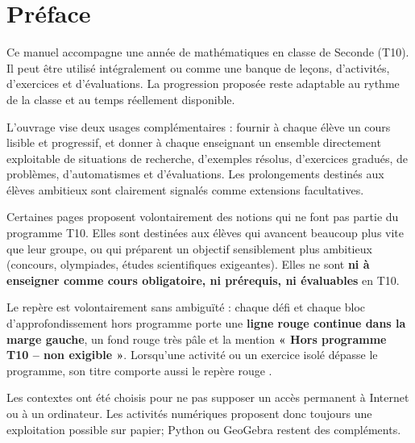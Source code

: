 \chapter*{Préface}

Ce manuel accompagne une année de mathématiques en classe de Seconde (T10).
Il peut être utilisé intégralement ou comme une banque de leçons, d'activités,
d'exercices et d'évaluations. La progression proposée reste adaptable au rythme
de la classe et au temps réellement disponible.

L'ouvrage vise deux usages complémentaires : fournir à chaque élève un cours
lisible et progressif, et donner à chaque enseignant un ensemble directement
exploitable de situations de recherche, d'exemples résolus, d'exercices gradués,
de problèmes, d'automatismes et d'évaluations. Les prolongements destinés aux
élèves ambitieux sont clairement signalés comme extensions facultatives.

\begin{extensiont10box}
Certaines pages proposent volontairement des notions qui ne font pas partie du
programme T10. Elles sont destinées aux élèves qui avancent beaucoup plus vite
que leur groupe, ou qui préparent un objectif sensiblement plus ambitieux
(concours, olympiades, études scientifiques exigeantes). Elles ne sont \textbf{ni
à enseigner comme cours obligatoire, ni prérequis, ni évaluables} en T10.

Le repère est volontairement sans ambiguïté : chaque défi et chaque bloc
d'approfondissement hors programme porte une \textbf{ligne rouge continue dans
la marge gauche}, un fond rouge très pâle et la mention
\textbf{« Hors programme T10 -- non exigible »}. Lorsqu'une activité ou un
exercice isolé dépasse le programme, son titre comporte aussi le repère rouge
\ExtensionTTen.\end{extensiont10box}

Les contextes ont été choisis pour ne pas supposer un accès permanent à
Internet ou à un ordinateur. Les activités numériques proposent donc toujours
une exploitation possible sur papier; Python ou GeoGebra restent des compléments.

